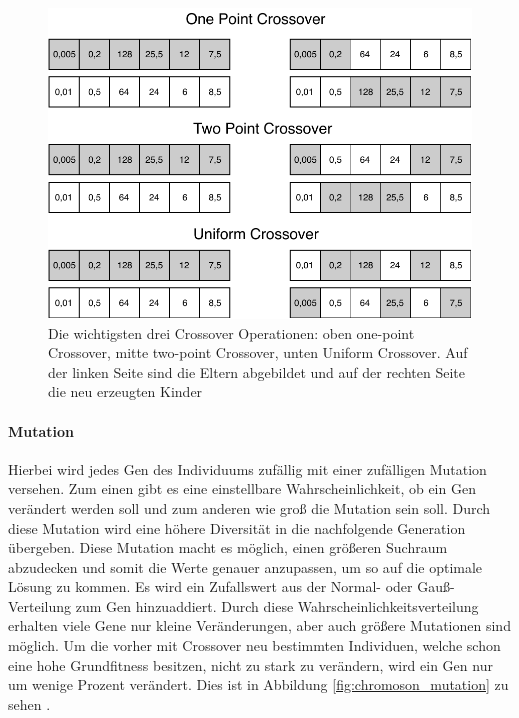 \begin{figure}[H]
  \centering  
  \includegraphics[scale=0.8]{img/crossover_gene.pdf}
  \caption[Crossover Varianten]{Die wichtigsten drei Crossover Operationen: oben one-point Crossover, mitte two-point Crossover, unten Uniform Crossover. Auf der linken Seite sind die Eltern abgebildet und auf der rechten Seite die neu erzeugten Kinder}
  \label{fig:chromoson_crossover}
\end{figure}


\paragraph{Mutation} Hierbei wird jedes Gen des Individuums zufällig mit einer zufälligen Mutation versehen. Zum einen gibt es eine einstellbare Wahrscheinlichkeit, ob ein Gen verändert werden soll und zum anderen wie groß die Mutation sein soll. Durch diese Mutation wird eine höhere Diversität in die nachfolgende Generation übergeben. Diese Mutation macht es möglich, einen größeren Suchraum abzudecken und somit die Werte genauer anzupassen, um so auf die optimale Lösung zu kommen. Es wird ein Zufallswert aus der Normal- oder Gauß-Verteilung zum Gen hinzuaddiert. Durch diese Wahrscheinlichkeitsverteilung erhalten viele Gene nur kleine Veränderungen, aber auch größere Mutationen sind möglich. Um die vorher mit Crossover neu bestimmten Individuen, welche schon eine hohe Grundfitness besitzen, nicht zu stark zu verändern, wird ein Gen nur um wenige Prozent verändert. Dies ist in Abbildung \ref{fig:chromoson_mutation} zu sehen\cite[p.~60]{weicker2015evolutionare} \cite[p.~140]{Gerdts2011}. 

